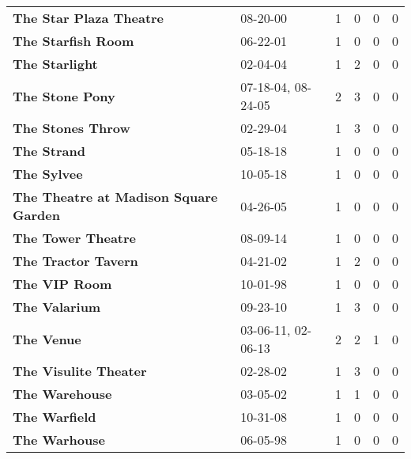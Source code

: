 \begin{supertabular}{p{0.4\textwidth}p{0.3\textwidth}p{0.05\textwidth}p{0.05\textwidth}p{0.05\textwidth}p{0.05\textwidth}}
                                      \textbf{The Star Plaza Theatre} &            08-20-00 &  1 &  0 &  0 &  0 \\
                                           \textbf{The Starfish Room} &            06-22-01 &  1 &  0 &  0 &  0 \\
                                               \textbf{The Starlight} &            02-04-04 &  1 &  2 &  0 &  0 \\
                                              \textbf{The Stone Pony} &  07-18-04, 08-24-05 &  2 &  3 &  0 &  0 \\
                                            \textbf{The Stones Throw} &            02-29-04 &  1 &  3 &  0 &  0 \\
                                                  \textbf{The Strand} &            05-18-18 &  1 &  0 &  0 &  0 \\
                                                  \textbf{The Sylvee} &            10-05-18 &  1 &  0 &  0 &  0 \\
                        \textbf{The Theatre at Madison Square Garden} &            04-26-05 &  1 &  0 &  0 &  0 \\
                                           \textbf{The Tower Theatre} &            08-09-14 &  1 &  0 &  0 &  0 \\
                                          \textbf{The Tractor Tavern} &            04-21-02 &  1 &  2 &  0 &  0 \\
                                                \textbf{The VIP Room} &            10-01-98 &  1 &  0 &  0 &  0 \\
                                                \textbf{The Valarium} &            09-23-10 &  1 &  3 &  0 &  0 \\
                                                   \textbf{The Venue} &  03-06-11, 02-06-13 &  2 &  2 &  1 &  0 \\
                                        \textbf{The Visulite Theater} &            02-28-02 &  1 &  3 &  0 &  0 \\
                                               \textbf{The Warehouse} &            03-05-02 &  1 &  1 &  0 &  0 \\
                                                \textbf{The Warfield} &            10-31-08 &  1 &  0 &  0 &  0 \\
                                                \textbf{The Warhouse} &            06-05-98 &  1 &  0 &  0 &  0 \\

\end{supertabular}
